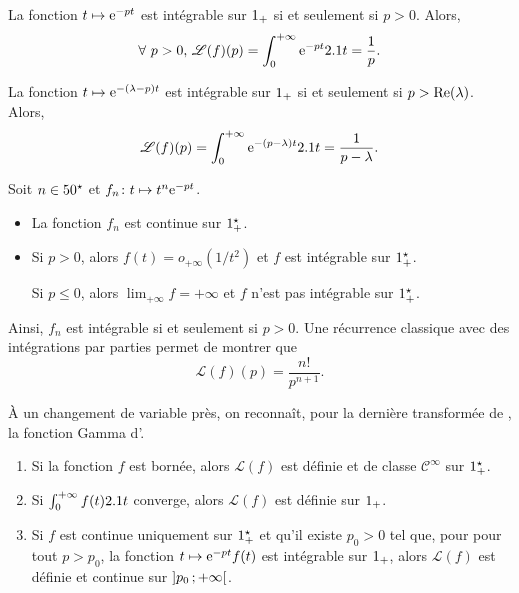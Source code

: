 \begin{solution}
\begin{reponses}
\item La fonction $t \mapsto \e^{-pt}$ est intégrable sur $\Rp$ si et seulement si $p > 0$. Alors,
\[
\forall\, p > 0,\,
\mathscr{L}(f)(p) = \int_0^{+\infty} \e^{-pt} \d t = \frac{1}{p}.
\]

\item La fonction $t \mapsto \e^{-(\lambda-p)t}$ est intégrable sur $\Rp$ si et seulement si $p > \Reel(\lambda)$. Alors,
\[
\mathscr{L}(f)(p)
= \int_0^{+\infty} \e^{-(p-\lambda)t} \d t
= \frac{1}{p-\lambda}.
\]

\item Soit $n \in \Ne$ et $\fonctionligne[f_n]{t}{t^n \e^{-pt}}$.
\begin{itemize}
\item La fonction $f_n$ est continue sur $\Rpe$.
\item Si $p > 0$, alors $f(t) = o_{+\infty}(1/t^2)$ et $f$ est intégrable sur $\Rpe$.

Si $p \leqslant 0$, alors $\lim_{+\infty} f = +\infty$ et $f$ n'est pas intégrable sur $\Rpe$.
\end{itemize}
Ainsi, $f_n$ est intégrable si et seulement si $p > 0$. Une récurrence classique avec des intégrations par parties permet de montrer que
\[
\mathscr{L}(f)(p) = \frac{n!}{p^{n+1}}.
\]
\end{reponses}
\end{solution}



\begin{remarque}
À un changement de variable près, on reconnaît, pour la dernière transformée de , la fonction Gamma d'.
\end{remarque}


\begin{theo}
\begin{enumerate}
\item Si la fonction $f$ est bornée, alors $\mathscr{L}(f)$ est définie et de classe $\mathscr{C}^\infty$ sur $\Rpe$.

\item Si $\int_0^{+\infty} f(t) \d t$ converge, alors $\mathscr{L}(f)$ est définie sur $\Rp$.

\item Si $f$ est continue uniquement sur $\Rpe$ et qu'il existe $p_0 > 0$ tel que, pour pour tout $p > p_0$, la fonction $t \mapsto \e^{-p t} f(t)$ est intégrable sur $\Rp$, alors $\mathscr{L}(f)$ est définie et continue sur $\interoo{p_0}{+\infty}$.
\end{enumerate}
\end{theo}

